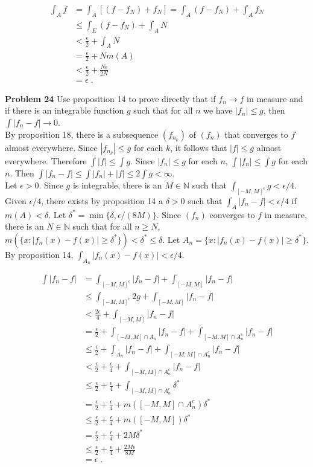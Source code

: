 \documentclass[a4paper]{article}
\begin{document}
\begin{align*}
\int_A f &= \int_A [(f - f_N) + f_N] = \int_A (f-f_N) + \int_A f_N\\
&\leq \int_E (f-f_N) + \int_A N \\
&< \frac{\epsilon}{2} + \int_A N \\
&= \frac{\epsilon}{2} + Nm(A)\\
&< \frac{\epsilon}{2}+ \frac{N\epsilon}{2N}\\
&= \epsilon \;.
\end{align*}

{\bf Problem 24} Use proposition 14 to prove directly that if $f_n \rightarrow f$ in measure and if there is an integrable function $g$ such that for all $n$ we have $|f_n| \leq g$, then $\int |f_n - f| \rightarrow 0$. \\

By proposition 18, there is a subsequence $(f_{n_k})$ of $(f_n)$ that converges to $f$ almost everywhere. Since $|f_{n_k}| \leq g$ for each $k$, it follows that $|f| \leq g$ almost everywhere. Therefore $\int |f| \leq \int g$. Since $|f_n| \leq g$ for each $n$, $\int |f_n| \leq \int g$ for each $n$. Then $\int |f_n - f| \leq \int |f_n| + |f|\leq 2\int g < \infty$. \\

Let $\epsilon > 0$. Since $g$ is integrable, there is an $M \in \mathbb{N}$ such that $\int_{[-M,M]^c} g < \epsilon / 4$. Given $\epsilon / 4$, there exists by proposition 14 a $\delta > 0$ such that $\int_A |f_n - f| < \epsilon /4$ if $m(A) < \delta$. Let $\delta^* = \min \{\delta, \epsilon / (8M) \}$. Since $(f_n)$ converges to $f$ in measure, there is an $N \in \mathbb{N}$ such that for all $n \geq N$, $m(\{x : |f_n(x) - f(x)| \geq \delta^* \}) < \delta^* \leq \delta$. Let $A_n = \{x : |f_n(x) - f(x)| \geq \delta^*\}$. By proposition 14, $\int_{A_n} |f_n(x) - f(x)| < \epsilon / 4$.

\begin{align*}
\int |f_n - f| &= \int_{[-M,M]^c} |f_n - f| + \int_{[-M,M]} |f_n - f| \\
&\leq \int_{[-M,M]^c} 2g + \int_{[-M,M]} |f_n - f| \\
&< \frac{2\epsilon}{4} + \int_{[-M,M]} |f_n - f| \\
&= \frac{\epsilon}{2} + \int_{[-M,M]\cap A_n} |f_n - f| + \int_{[-M,M]\cap A_n^c} |f_n - f| \\
&\leq \frac{\epsilon}{2} + \int_{A_n} |f_n - f| + \int_{[-M,M]\cap A_n^c} |f_n - f| \\
&<\frac{\epsilon}{2} + \frac{\epsilon}{4} + \int_{[-M,M]\cap A_n^c} |f_n - f| \\
&\leq  \frac{\epsilon}{2} + \frac{\epsilon}{4} + \int_{[-M,M]\cap A_n^c} \delta^* \\
&=  \frac{\epsilon}{2} + \frac{\epsilon}{4} + m([-M,M]\cap A_n^c) \delta^* \\
&\leq  \frac{\epsilon}{2} + \frac{\epsilon}{4} + m([-M,M]) \delta^* \\
&=  \frac{\epsilon}{2} + \frac{\epsilon}{4} + 2M \delta^* \\
&\leq \frac{\epsilon}{2} + \frac{\epsilon}{4} + \frac{2M\epsilon}{8M} \\
&= \epsilon \;.
\end{align*}
\end{document}
